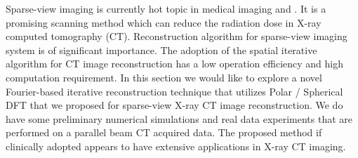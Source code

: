 \documentclass{UCF_ETD}
\begin{document}
Sparse-view imaging is currently hot topic in medical imaging \cite{Liu2014} and \cite{Yan2015}. It is a promising scanning method which can reduce the radiation dose in X-ray computed tomography (CT). Reconstruction algorithm for sparse-view imaging system is of significant importance. The adoption of the spatial iterative algorithm for CT image reconstruction has a low operation efficiency and high computation requirement. In this section we would like to explore a novel Fourier-based
iterative reconstruction technique that utilizes Polar / Spherical DFT that we proposed for sparse-view X-ray CT image reconstruction. We do have some preliminary numerical simulations and real data experiments that are performed on a parallel beam CT acquired data. The proposed method if clinically adopted appears to have extensive applications in X-ray CT imaging.
\end{document}
